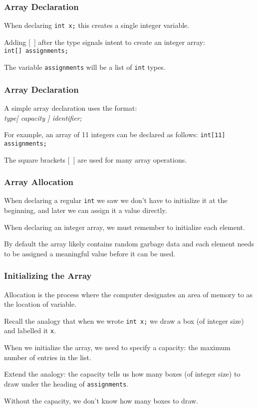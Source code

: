 \begin{frame}
\frametitle{Array Declaration}


When declaring \texttt{int x;} this creates a single integer variable.

Adding [~] after the type signals intent to create an integer array:\\
\quad \texttt{int[] assignments;}

The variable \texttt{assignments} will be a list of \texttt{int} types.

\end{frame}

\begin{frame}
\frametitle{Array Declaration}

A simple array declaration uses the format:\\
\quad \textit{type[ capacity ] identifier;}

For example, an array of 11 integers can be declared as follows:
\texttt{int[11] assignments;}

The square brackets [~] are used for many array operations.

\end{frame}



\begin{frame}
\frametitle{Array Allocation}
When declaring a regular \texttt{int} we saw we don't have to initialize it at the beginning, and later we can assign it a value directly.

When declaring an integer array, we must remember to initialize each element.

By default the array likely contains random garbage data and each element needs to be assigned a meaningful value before it can be used. 

\end{frame}

\begin{frame}
\frametitle{Initializing the Array}

Allocation is the process where the computer designates an area of memory to as the location of variable. 

Recall the analogy that when we wrote \texttt{int x;} we draw a box (of integer size) and labelled it \texttt{x}.

When we initialize the array, we need to specify a capacity: the maximum number of entries in the list.

Extend the analogy: the capacity tells us how many boxes (of integer size) to draw under the heading of \texttt{assignments}.

Without the capacity, we don't know how many boxes to draw.

\end{frame}

